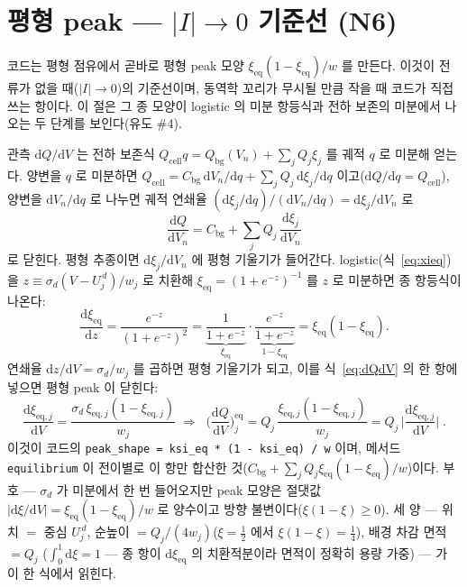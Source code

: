 \documentclass[11pt,a4paper]{article}
\newcommand{\dd}{\mathrm{d}}
\newcommand{\eq}{\mathrm{eq}}
\newcommand{\cell}{\mathrm{cell}}
\newcommand{\bg}{\mathrm{bg}}
\newcommand{\code}[1]{\texttt{#1}}
\begin{document}
\section{평형 peak — $|I|\to0$ 기준선 (N6)}\label{sec:eqpeak}
코드는 평형 점유에서 곧바로 평형 peak 모양 $\xi_\eq(1-\xi_\eq)/w$ 를 만든다. 이것이 전류가 없을 때($|I|\to0$)의
기준선이며, 동역학 꼬리가 무시될 만큼 작을 때 코드가 직접 쓰는 항이다. 이 절은 그 종 모양이 logistic 의 미분
항등식과 전하 보존의 미분에서 나오는 두 단계를 보인다(유도 \#4).

관측 $\dd Q/\dd V$ 는 전하 보존식 $Q_\cell q=Q_\bg(V_n)+\sum_jQ_j\xi_j$ 를 궤적 $q$ 로 미분해 얻는다. 양변을
$q$ 로 미분하면 $Q_\cell=C_\bg\,\dd V_n/\dd q+\sum_jQ_j\,\dd\xi_j/\dd q$ 이고($\dd Q/\dd q=Q_\cell$), 양변을
$\dd V_n/\dd q$ 로 나누면 궤적 연쇄율 $(\dd\xi_j/\dd q)/(\dd V_n/\dd q)=\dd\xi_j/\dd V_n$ 로
\begin{equation}
\frac{\dd Q}{\dd V_n}=C_\bg+\sum_jQ_j\,\frac{\dd\xi_j}{\dd V_n}
\label{eq:dQdV}
\end{equation}
로 닫힌다. 평형 추종이면 $\dd\xi_j/\dd V_n$ 에 평형 기울기가 들어간다. logistic(식~\eqref{eq:xieq})을
$z\equiv\sigma_d(V-U_j^{\,d})/w_j$ 로 치환해 $\xi_\eq=(1+e^{-z})^{-1}$ 를 $z$ 로 미분하면 종 항등식이 나온다:
\begin{equation}
\frac{\dd\xi_\eq}{\dd z}=\frac{e^{-z}}{(1+e^{-z})^2}
=\underbrace{\frac{1}{1+e^{-z}}}_{\xi_\eq}\cdot\underbrace{\frac{e^{-z}}{1+e^{-z}}}_{1-\xi_\eq}
=\xi_\eq(1-\xi_\eq).
\label{eq:belliden}
\end{equation}
연쇄율 $\dd z/\dd V=\sigma_d/w_j$ 를 곱하면 평형 기울기가 되고, 이를 식~\eqref{eq:dQdV} 의 한 항에 넣으면 평형 peak 이
닫힌다:
\begin{equation}
\frac{\dd\xi_{\eq,j}}{\dd V}=\frac{\sigma_d\,\xi_{\eq,j}(1-\xi_{\eq,j})}{w_j}
\;\Longrightarrow\;
\boxed{\;\Big(\frac{\dd Q}{\dd V}\Big)^\eq_j
=Q_j\,\frac{\xi_{\eq,j}(1-\xi_{\eq,j})}{w_j}
=Q_j\,\Big|\frac{\dd\xi_{\eq,j}}{\dd V}\Big|\;.}
\label{eq:eqpeak}
\end{equation}
이것이 코드의 \code{peak\_shape = ksi\_eq * (1 - ksi\_eq) / w} 이며, 메서드 \code{equilibrium} 이 전이별로 이 항만
합산한 것($C_\bg+\sum_jQ_j\xi_\eq(1-\xi_\eq)/w$)이다. 부호 --- $\sigma_d$ 가 미분에서 한 번 들어오지만 peak 모양은
절댓값 $|\dd\xi/\dd V|=\xi_\eq(1-\xi_\eq)/w$ 로 양수이고 방향 불변이다($\xi(1-\xi)\ge0$). 세 양 --- 위치 $=$ 중심
$U_j^{\,d}$, 순높이 $=Q_j/(4w_j)$($\xi=\tfrac12$ 에서 $\xi(1-\xi)=\tfrac14$), 배경 차감 면적 $=Q_j$
($\int_0^1\dd\xi=1$ --- 종 항이 $\dd\xi_\eq$ 의 치환적분이라 면적이 정확히 용량 가중) --- 가 이 한 식에서 읽힌다.
\end{document}
